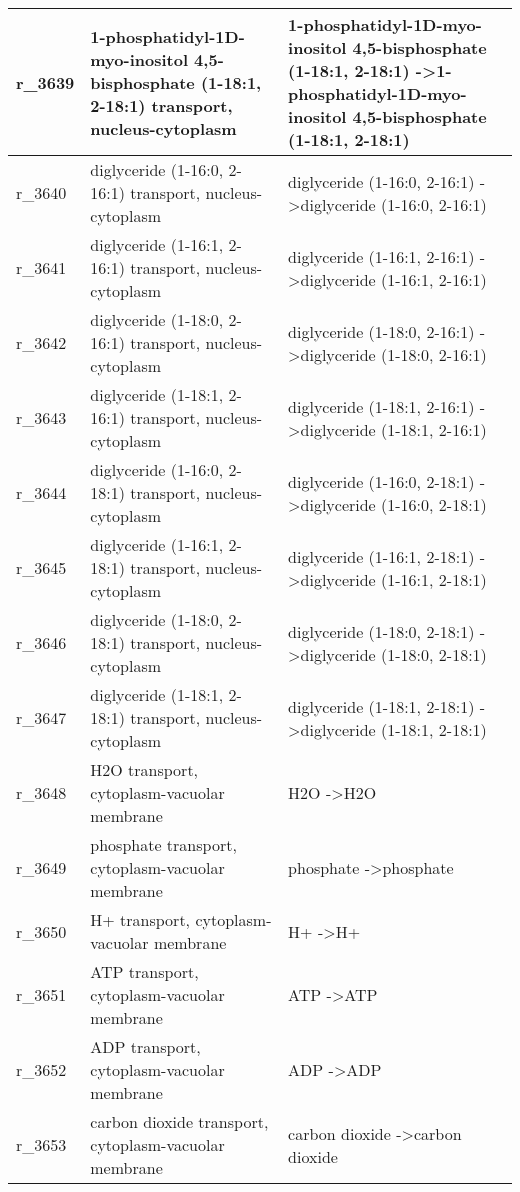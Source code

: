 \begin{landscape}
{\begin{longtable}{|l|p{7cm}|p{15cm}|}
r\_3639 & 1-phosphatidyl-1D-myo-inositol 4,5-bisphosphate (1-18:1, 2-18:1) transport, nucleus-cytoplasm & 1-phosphatidyl-1D-myo-inositol 4,5-bisphosphate (1-18:1, 2-18:1)  -\textgreater 1-phosphatidyl-1D-myo-inositol 4,5-bisphosphate (1-18:1, 2-18:1) \\ \hline
r\_3640 & diglyceride (1-16:0, 2-16:1) transport, nucleus-cytoplasm & diglyceride (1-16:0, 2-16:1)  -\textgreater diglyceride (1-16:0, 2-16:1) \\ \hline
r\_3641 & diglyceride (1-16:1, 2-16:1) transport, nucleus-cytoplasm & diglyceride (1-16:1, 2-16:1)  -\textgreater diglyceride (1-16:1, 2-16:1) \\ \hline
r\_3642 & diglyceride (1-18:0, 2-16:1) transport, nucleus-cytoplasm & diglyceride (1-18:0, 2-16:1)  -\textgreater diglyceride (1-18:0, 2-16:1) \\ \hline
r\_3643 & diglyceride (1-18:1, 2-16:1) transport, nucleus-cytoplasm & diglyceride (1-18:1, 2-16:1)  -\textgreater diglyceride (1-18:1, 2-16:1) \\ \hline
r\_3644 & diglyceride (1-16:0, 2-18:1) transport, nucleus-cytoplasm & diglyceride (1-16:0, 2-18:1)  -\textgreater diglyceride (1-16:0, 2-18:1) \\ \hline
r\_3645 & diglyceride (1-16:1, 2-18:1) transport, nucleus-cytoplasm & diglyceride (1-16:1, 2-18:1)  -\textgreater diglyceride (1-16:1, 2-18:1) \\ \hline
r\_3646 & diglyceride (1-18:0, 2-18:1) transport, nucleus-cytoplasm & diglyceride (1-18:0, 2-18:1)  -\textgreater diglyceride (1-18:0, 2-18:1) \\ \hline
r\_3647 & diglyceride (1-18:1, 2-18:1) transport, nucleus-cytoplasm & diglyceride (1-18:1, 2-18:1)  -\textgreater diglyceride (1-18:1, 2-18:1) \\ \hline
r\_3648 & H2O transport, cytoplasm-vacuolar membrane & H2O  -\textgreater H2O \\ \hline
r\_3649 & phosphate transport, cytoplasm-vacuolar membrane & phosphate  -\textgreater phosphate \\ \hline
r\_3650 & H+ transport, cytoplasm-vacuolar membrane & H+  -\textgreater H+ \\ \hline
r\_3651 & ATP transport, cytoplasm-vacuolar membrane & ATP  -\textgreater ATP \\ \hline
r\_3652 & ADP transport, cytoplasm-vacuolar membrane & ADP  -\textgreater ADP \\ \hline
r\_3653 & carbon dioxide transport, cytoplasm-vacuolar membrane & carbon dioxide  -\textgreater carbon dioxide \\ \hline

\end{longtable}}
\end{landscape}
